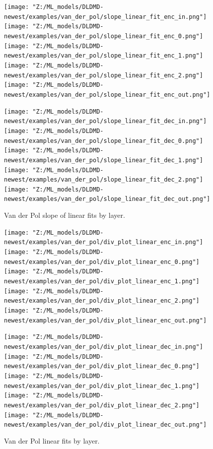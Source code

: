 \begin{figure}[!htbp]
    \centering
    \begin{minipage}{.5\textwidth}
        \texttt{[image: "Z:/ML\_models/DLDMD-newest/examples/van\_der\_pol/slope\_linear\_fit\_enc\_in.png"]} 
        \texttt{[image: "Z:/ML\_models/DLDMD-newest/examples/van\_der\_pol/slope\_linear\_fit\_enc\_0.png"]} 
        \texttt{[image: "Z:/ML\_models/DLDMD-newest/examples/van\_der\_pol/slope\_linear\_fit\_enc\_1.png"]} 
        \texttt{[image: "Z:/ML\_models/DLDMD-newest/examples/van\_der\_pol/slope\_linear\_fit\_enc\_2.png"]} 
        \texttt{[image: "Z:/ML\_models/DLDMD-newest/examples/van\_der\_pol/slope\_linear\_fit\_enc\_out.png"]} 
    \end{minipage}%
    \begin{minipage}{.5\textwidth}
        \texttt{[image: "Z:/ML\_models/DLDMD-newest/examples/van\_der\_pol/slope\_linear\_fit\_dec\_in.png"]} 
        \texttt{[image: "Z:/ML\_models/DLDMD-newest/examples/van\_der\_pol/slope\_linear\_fit\_dec\_0.png"]} 
        \texttt{[image: "Z:/ML\_models/DLDMD-newest/examples/van\_der\_pol/slope\_linear\_fit\_dec\_1.png"]} 
        \texttt{[image: "Z:/ML\_models/DLDMD-newest/examples/van\_der\_pol/slope\_linear\_fit\_dec\_2.png"]} 
        \texttt{[image: "Z:/ML\_models/DLDMD-newest/examples/van\_der\_pol/slope\_linear\_fit\_dec\_out.png"]} 
    \end{minipage}
    \caption{Van der Pol slope of linear fits by layer.}
    \label{fig:van der pol slopes all layers}
\end{figure}

\begin{figure}[!htbp]
    \centering
    \begin{minipage}{.5\textwidth}
        \texttt{[image: "Z:/ML\_models/DLDMD-newest/examples/van\_der\_pol/div\_plot\_linear\_enc\_in.png"]} 
        \texttt{[image: "Z:/ML\_models/DLDMD-newest/examples/van\_der\_pol/div\_plot\_linear\_enc\_0.png"]} 
        \texttt{[image: "Z:/ML\_models/DLDMD-newest/examples/van\_der\_pol/div\_plot\_linear\_enc\_1.png"]} 
        \texttt{[image: "Z:/ML\_models/DLDMD-newest/examples/van\_der\_pol/div\_plot\_linear\_enc\_2.png"]} 
        \texttt{[image: "Z:/ML\_models/DLDMD-newest/examples/van\_der\_pol/div\_plot\_linear\_enc\_out.png"]} 
    \end{minipage}%
    \begin{minipage}{.5\textwidth}
        \texttt{[image: "Z:/ML\_models/DLDMD-newest/examples/van\_der\_pol/div\_plot\_linear\_dec\_in.png"]} 
        \texttt{[image: "Z:/ML\_models/DLDMD-newest/examples/van\_der\_pol/div\_plot\_linear\_dec\_0.png"]} 
        \texttt{[image: "Z:/ML\_models/DLDMD-newest/examples/van\_der\_pol/div\_plot\_linear\_dec\_1.png"]} 
        \texttt{[image: "Z:/ML\_models/DLDMD-newest/examples/van\_der\_pol/div\_plot\_linear\_dec\_2.png"]} 
        \texttt{[image: "Z:/ML\_models/DLDMD-newest/examples/van\_der\_pol/div\_plot\_linear\_dec\_out.png"]} 
    \end{minipage}
    \caption{Van der Pol linear fits by layer.}
    \label{fig:van der pol linear fits all layers}
\end{figure}


